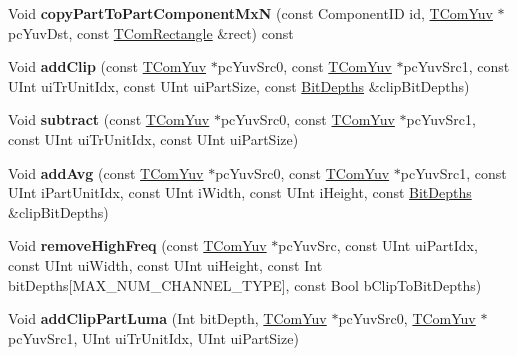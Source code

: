 \begin{DoxyCompactItemize}
\item 
\mbox{\label{class_t_com_yuv_a4c57247b420bc0e679782eb70200e57b}} 
Void {\bfseries copy\+Part\+To\+Part\+Component\+MxN} (const Component\+ID id, \hyperlink{class_t_com_yuv}{T\+Com\+Yuv} $\ast$pc\+Yuv\+Dst, const \hyperlink{struct_t_com_rectangle}{T\+Com\+Rectangle} \&rect) const
\item 
\mbox{\label{class_t_com_yuv_a4fb238a982bd290f911e37d51f4148a4}} 
Void {\bfseries add\+Clip} (const \hyperlink{class_t_com_yuv}{T\+Com\+Yuv} $\ast$pc\+Yuv\+Src0, const \hyperlink{class_t_com_yuv}{T\+Com\+Yuv} $\ast$pc\+Yuv\+Src1, const U\+Int ui\+Tr\+Unit\+Idx, const U\+Int ui\+Part\+Size, const \hyperlink{struct_bit_depths}{Bit\+Depths} \&clip\+Bit\+Depths)
\item 
\mbox{\label{class_t_com_yuv_ab43bcf2e10bf907d724bbd294231e194}} 
Void {\bfseries subtract} (const \hyperlink{class_t_com_yuv}{T\+Com\+Yuv} $\ast$pc\+Yuv\+Src0, const \hyperlink{class_t_com_yuv}{T\+Com\+Yuv} $\ast$pc\+Yuv\+Src1, const U\+Int ui\+Tr\+Unit\+Idx, const U\+Int ui\+Part\+Size)
\item 
\mbox{\label{class_t_com_yuv_abdb1c25f2d4bc036579328f025b58b29}} 
Void {\bfseries add\+Avg} (const \hyperlink{class_t_com_yuv}{T\+Com\+Yuv} $\ast$pc\+Yuv\+Src0, const \hyperlink{class_t_com_yuv}{T\+Com\+Yuv} $\ast$pc\+Yuv\+Src1, const U\+Int i\+Part\+Unit\+Idx, const U\+Int i\+Width, const U\+Int i\+Height, const \hyperlink{struct_bit_depths}{Bit\+Depths} \&clip\+Bit\+Depths)
\item 
\mbox{\label{class_t_com_yuv_af8a851c01899bc7f4bad36dfb01d6c2d}} 
Void {\bfseries remove\+High\+Freq} (const \hyperlink{class_t_com_yuv}{T\+Com\+Yuv} $\ast$pc\+Yuv\+Src, const U\+Int ui\+Part\+Idx, const U\+Int ui\+Width, const U\+Int ui\+Height, const Int bit\+Depths\mbox{[}M\+A\+X\+\_\+\+N\+U\+M\+\_\+\+C\+H\+A\+N\+N\+E\+L\+\_\+\+T\+Y\+PE\mbox{]}, const Bool b\+Clip\+To\+Bit\+Depths)
\item 
\mbox{\label{class_t_com_yuv_af80864e20769d4ceac5b96c0a1f55a4a}} 
Void {\bfseries add\+Clip\+Part\+Luma} (Int bit\+Depth, \hyperlink{class_t_com_yuv}{T\+Com\+Yuv} $\ast$pc\+Yuv\+Src0, \hyperlink{class_t_com_yuv}{T\+Com\+Yuv} $\ast$pc\+Yuv\+Src1, U\+Int ui\+Tr\+Unit\+Idx, U\+Int ui\+Part\+Size)

\end{DoxyCompactItemize}
